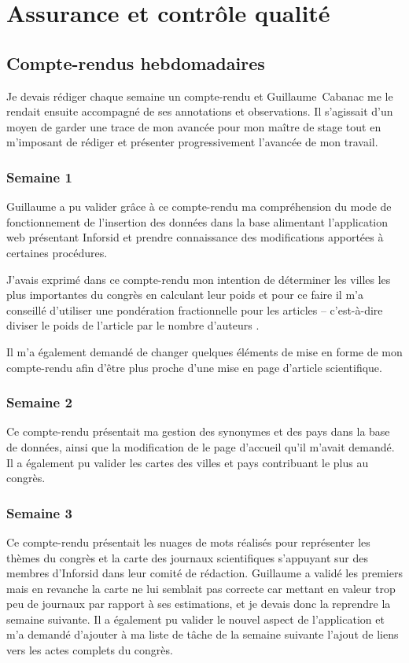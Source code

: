 \cleardoublepage
{}

\chapter{Assurance et contrôle qualité}



\section{Compte-rendus hebdomadaires}
	Je devais rédiger chaque semaine un compte-rendu et Guillaume~Cabanac me le rendait ensuite accompagné de ses annotations et observations. Il s'agissait d'un moyen de garder une trace de mon avancée pour mon maître de stage tout en m'imposant de rédiger et présenter progressivement l'avancée de mon travail.
	
	
	\subsection{Semaine 1}
		Guillaume a pu valider grâce à ce compte-rendu ma compréhension du mode de fonctionnement de l'insertion des données dans la base alimentant l'application web présentant Inforsid et prendre connaissance des modifications apportées à certaines procédures.
		
		J'avais exprimé dans ce compte-rendu mon intention de déterminer les villes les plus importantes du congrès en calculant leur poids et pour ce faire il m'a conseillé d'utiliser une pondération fractionnelle pour les articles -- c'est-à-dire diviser le poids de l'article par le nombre d'auteurs \citep{geometric}.
		
		Il m'a également demandé de changer quelques éléments de mise en forme de mon compte-rendu afin d'être plus proche d'une mise en page d'article scientifique.
	
	
	\subsection{Semaine 2}
		Ce compte-rendu présentait ma gestion des synonymes et des pays dans la base de données, ainsi que la modification de le page d'accueil qu'il m'avait demandé. Il a également pu valider les cartes des villes et pays contribuant le plus au congrès.
	
	
	\subsection{Semaine 3}
		Ce compte-rendu présentait les nuages de mots réalisés pour représenter les thèmes du congrès et la carte des journaux scientifiques s'appuyant sur des membres d'Inforsid dans leur comité de rédaction. Guillaume a validé les premiers mais en revanche la carte ne lui semblait pas correcte car mettant en valeur trop peu de journaux par rapport à ses estimations, et je devais donc la reprendre la semaine suivante.
		Il a également pu valider le nouvel aspect de l'application et m'a demandé d'ajouter à ma liste de tâche de la semaine suivante l'ajout de liens vers les actes complets du congrès.
	
